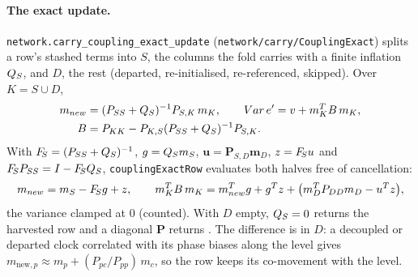 \documentclass[main.tex]{subfiles}
\begin{document}
\paragraph{The exact update.}
\texttt{network.carry\_coupling\_exact\_update}
(\texttt{network/carry/CouplingExact}) splits a row's stashed terms into
$S$, the columns the fold carries with a finite inflation $Q_S$, and
$D$, the rest (departed, re-initialised, re-referenced, skipped). Over
$K = S \cup D$,
\begin{equation}
\begin{aligned}
m_{new} &= (P_{SS} + Q_S)^{-1}P_{S,K}\,m_K,
\qquad
Var\,e' = v + m_K^{T}B\,m_K,\\
B &= P_{KK} - P_{K,S}(P_{SS}+Q_S)^{-1}P_{S,K}.
\end{aligned}
\label{eq:veh-exact}
\end{equation}
With $F_{\!S} = (P_{SS}+Q_S)^{-1}$, $g = Q_Sm_S$,
$\bm{u} = \bm{P}_{S,D}\bm{m}_D$, $z = F_{\!S}u$ and
$F_{\!S}P_{SS} = I - F_{\!S}Q_S$, \texttt{couplingExactRow}
evaluates both halves free of cancellation:
\begin{equation}
m_{new} = m_S - F_{\!S}g + z,
\qquad
m_K^{T}B\,m_K = m_{new}^{T}g + g^{T}z
 + \big(m_D^{T}P_{DD}m_D - u^{T}z\big),
\label{eq:veh-exactform}
\end{equation}
the variance clamped at $0$ (counted). With $D$ empty, $Q_S = 0$
returns the harvested row and a diagonal $\bm{P}$ returns
. The difference is in $D$: a decoupled or departed
clock correlated with its phase biases along the level gives
$m_{\mathrm{new},p} \approx m_p + (P_{pc}/P_{pp})\,m_c$, so the row keeps
its co-movement with the level.
\end{document}
